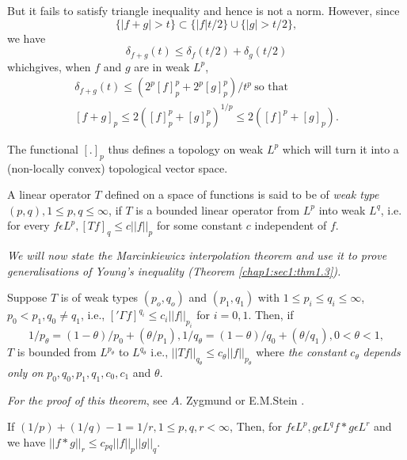 But it fails to satisfy triangle inequality and hence is not a
norm. However, since 
$$
\{ |f +g | > t \} \subset \{|f| t/2 \} \cup \{|g | > t/2 \},
$$
we have
$$
\delta_{f+g} (t) \le \delta_f (t/2) + \delta_g (t/2)
$$
which\pageoriginale gives, when $f$ and $g$ are in weak $L^p$,
\begin{gather*}
  \delta_{f+g} (t) \le (2^p [f]^p_p + 2^p [g]^p_p)/t^p  ~ \text {so that}\\
        [f + g]_p \le 2([f]^p_p + [g]^p_p)^{1/p} \le 2([f]^p + [g]_p).
\end{gather*}

The functional $[.]_p$ thus defines a topology on weak $L^p$ which
will turn it into a (non-locally convex) topological vector space.  

\setcounter{defi}{10}
\begin{defi} \label{chap5:def5.11}%
  A linear operator $T$ defined on a space of functions is said to be of
  {\em weak type} $(p, q), 1\le  p, q \le \infty$, if $T$ is a bounded linear
  operator from $L^p$ into weak $L^q$, i.e. for every $f \epsilon
  L^p, [Tf]_q \le c || f ||_p$ for some constant $c$ independent of
  $f$. 
\end{defi}

\textit { We will now state the Marcinkiewicz interpolation theorem
  and use it to prove generalisations of Young's inequality (Theorem
  \ref{chap1:sec1:thm1.3}). } 

\setcounter{thm}{11}
\begin{thm}[J. Marcinkiewicz]\label{chap5:thm5.12} %
  Suppose  $T$ is of weak types  $
  (p_o, q_o) $ and $(p_1, q_1)$ with $1 \le p_i \le q_i
  \le \infty$, $p_0 < p_1, q_0 \neq q_1$, i.e., $['\Gamma f]^{q_i} \le
  c_i || f ||_{p_i}$ for  $i = 0, 1$. Then,  if  
$$
1/p_{\theta} = (1-\theta)/p_0 + (\theta/p_1), 1/q_{\theta} =
(1-\theta)/q_0 + (\theta/q_1), 0 < \theta < 1, 
$$
$T$ is bounded from $L^{p_{\theta}}$ to $L^{q_{\theta}}$ i.e., $|| Tf
||_{q_{\theta}} \le c_{\theta} || f ||_{p_{\theta}}$ where {\em the
  constant } $c_{\theta}$ {\em depends only on} $p_0, q_0, p_1, q_1,
c_0, c_1$ and $\theta$. 
\end{thm}

\textit {For the proof of this theorem}, see $A$. Zygmund \cite{5} or
E.M.Stein \cite{2}.
 
\setcounter{thm}{12}
\begin{thm}\label{chap5:thm5.13}  
  If $(1/p) + (1/q) - 1 =
  1/r, 1 \le p, q, r< \infty$, Then, for $f \epsilon L^p, g
  \epsilon L^q f * g \epsilon L^r$ and we have $|| f * g
  ||_r \le c_{pq} || f ||_p || g||_q$.  
\end{thm}

